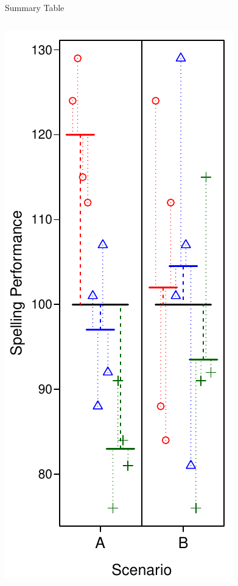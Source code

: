 \documentclass[presentation]{beamer}
\begin{document}
\begin{frame}[label={sec:org4be8ac6}]{Summary Table}
\begin{columns}
\begin{column}{.27\columnwidth}
\includegraphics[scale=.5]{08_glm_img/spelling-05.pdf}
\end{column}


\end{columns}
\end{frame}
\end{document}
